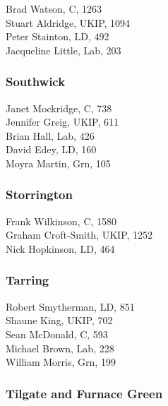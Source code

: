 \documentclass[a4paper,openany,10pt]{book}
\begin{document}


Brad Watson, C, 1263\\
Stuart Aldridge, UKIP, 1094\\
Peter Stainton, LD, 492\\
Jacqueline Little, Lab, 203\\


\subsubsection*{Southwick}



Janet Mockridge, C, 738\\
Jennifer Greig, UKIP, 611\\
Brian Hall, Lab, 426\\
David Edey, LD, 160\\
Moyra Martin, Grn, 105\\


\subsubsection*{Storrington}



Frank Wilkinson, C, 1580\\
Graham Croft-Smith, UKIP, 1252\\
Nick Hopkinson, LD, 464\\


\subsubsection*{Tarring}



Robert Smytherman, LD, 851\\
Shaune King, UKIP, 702\\
Sean McDonald, C, 593\\
Michael Brown, Lab, 228\\
William Morris, Grn, 199\\


\subsubsection*{Tilgate and Furnace Green}
\end{document}
